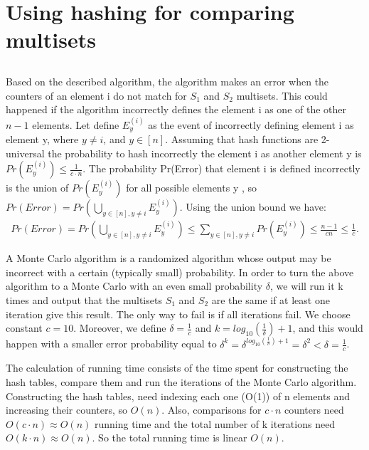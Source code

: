 \documentclass[11pt]{537homework}
\begin{document}
\section{Using hashing for comparing multisets}
\subsection{} 
Based on the described algorithm, the algorithm makes an error when the counters of an element i do not match for $S_1$ and $S_2$ multisets. This could happened if the algorithm incorrectly defines the element i as one of the other $n-1$ elements. Let define $E_y^{(i)}$ as the event of incorrectly defining element i as element y, where $y \neq i$, and  $y \in [n]$. Assuming that hash functions are 2-universal the probability to hash incorrectly the element i as another element y is $Pr(E_y^{(i)}) \leq \frac{1}{c \cdot n}$.  The probability Pr(Error) that element i is defined incorrectly is the union of $Pr(E_y^{(i)})$  for all possible elements y , so $Pr(Error) = Pr( \bigcup_{y \in [n], y \neq i} E_y^{(i)}) $. Using the union bound we have: 
\begin{align*}
Pr(Error) = Pr( \bigcup_{y \in [n], y \neq i} E_y^{(i)}) \leq \sum_{y \in [n], y \neq i}^{} Pr(E_y^{(i)}) \leq \frac{n-1}{cn} \leq \frac{1}{c}.
\end{align*}
\par  A Monte Carlo algorithm is a randomized algorithm whose output may be incorrect with a certain (typically small) probability. In order to turn the above algorithm to a Monte Carlo with an even small probability $\delta$, we will run it k times and output that the multisets $S_1$ and $S_2$ are the same if at least one iteration give this result. The only way to fail is if all iterations fail.
We choose constant $c = 10$. Moreover, we define $\delta = \frac{1}{c} $ and $k = log_{10}(\frac{1}{\delta}) + 1$,
and this would happen with a smaller error probability equal to $\delta^{k} = \delta^{log_{10}(\frac{1}{\delta})+1} = \delta^2 < \delta = \frac{1}{c}$.
\par The calculation of running time consists of the time spent for constructing the hash tables, compare them and run the iterations of the Monte Carlo algorithm. Constructing the hash tables, need indexing each one (O(1)) of n elements and increasing their counters, so $O(n)$. Also, comparisons for $c\cdot n$ counters need $O(c \cdot n) \approx O(n)$ running time and the total number of k iterations need $O(k \cdot n) \approx O(n)$. So the total running time is linear $O(n)$. 
\end{document}
